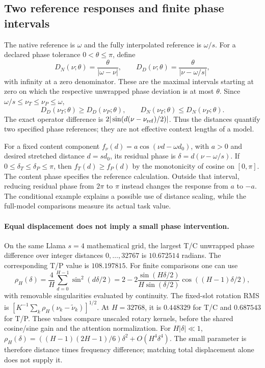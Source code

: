 \subsection{Two reference responses and finite phase intervals}
\label{sec:allocation-reference-intervals}
The native reference is $\omega$ and the fully interpolated reference is
$\omega/s$. For a declared phase tolerance $0<\theta\le\pi$, define
\begin{equation}
D_N(\nu;\theta)=\frac{\theta}{|\omega-\nu|},\qquad
D_D(\nu;\theta)=\frac{\theta}{|\nu-\omega/s|},
\label{eq:allocation-reference-distances}
\end{equation}
with infinity at a zero denominator. These are the maximal intervals
starting at zero on which the respective unwrapped phase deviation is at
most $\theta$. Since $\omega/s\le\nu_T\le\nu_P\le\omega$,
\begin{equation}
D_D(\nu_T;\theta)\ge D_D(\nu_P;\theta),\qquad
D_N(\nu_T;\theta)\le D_N(\nu_P;\theta).
\label{eq:allocation-reference-order}
\end{equation}
The exact operator difference is
$2|\sin(d(\nu-\nu_{\rm ref})/2)|$.
Thus the distances quantify two specified phase references; they are not
effective context lengths of a model.

For a fixed content component
$f_\nu(d)=a\cos(\nu d-\omega d_0)$, with $a>0$ and desired stretched
distance $d=sd_0$, its residual phase is $\delta=d(\nu-\omega/s)$.
If $0\le\delta_T\le\delta_P\le\pi$, then $f_T(d)\ge f_P(d)$ by the
monotonicity of cosine on $[0,\pi]$. The content phase specifies the
reference calculation. Outside that interval, reducing residual phase
from $2\pi$ to $\pi$ instead changes the response from $a$ to $-a$.
The conditional example explains a possible use of distance scaling,
while the full-model comparisons measure its actual task value.

\paragraph{Equal displacement does not imply a small phase intervention.}
On the same Llama $s=4$ mathematical grid, the largest T/C unwrapped
phase difference over integer distances $0,\ldots,32767$ is
$10.672514$ radians. The corresponding T/P value is $108.197815$.
For finite comparisons one can use
\begin{equation}
\rho_H(\delta)=\frac4H\sum_{d=0}^{H-1}\sin^2(d\delta/2)
=2-2\frac{\sin(H\delta/2)}{H\sin(\delta/2)}
\cos((H-1)\delta/2),
\label{eq:allocation-finite-phase-cost}
\end{equation}
with removable singularities evaluated by continuity. The fixed-slot
rotation RMS is $[K^{-1}\sum_k\rho_H(\nu_k-\widetilde\nu_k)]^{1/2}$.
At $H=32768$, it is $0.448329$ for T/C and $0.687543$ for T/P.
These values compare unscaled rotary kernels, before the shared
cosine/sine gain and the attention normalization.
For $H|\delta|\ll1$,
$\rho_H(\delta)=((H-1)(2H-1)/6)\delta^2+O(H^4\delta^4)$.
The small parameter is therefore distance times frequency difference;
matching total displacement alone does not supply it.
